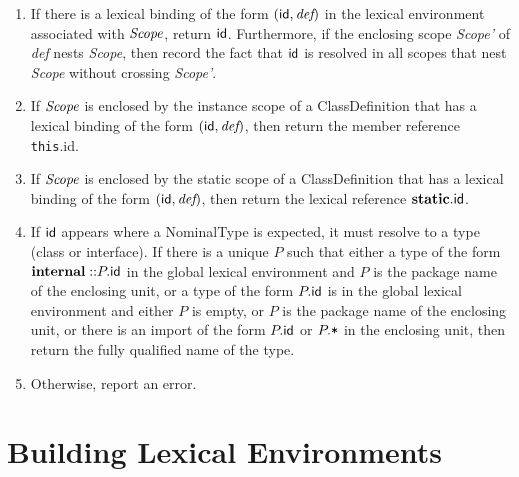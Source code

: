 \makeatletter{}\documentclass[10pt,oneside]{book}
\newcommand{\nonterminal}[1]{{\slantsf #1}}
\theoremstyle{note}
\newcommand{\id}{{\sf id}}
\begin{document}
\begin{enumerate}
\item 
 If there is a lexical binding of the form $(\id, \emph{def})$ in the lexical environment
associated with $\emph{Scope}$, return $\id$. Furthermore, if the
enclosing scope \emph{Scope'} of \emph{def} nests 
\emph{Scope}, then record the
fact that $\id$ is resolved in all scopes that nest \emph{Scope}
without crossing \emph{Scope'}.
\item If $\emph{Scope}$ is enclosed by the instance scope of a
  \nonterminal{ClassDefinition} that has a lexical binding of the form
  $(\id,\emph{def})$, then
return the member reference \verb'this'.\id. 
\item If $\emph{Scope}$ is enclosed by the static scope of a
  \nonterminal{ClassDefinition} that has a lexical binding of the form
  $(\id,\emph{def})$, then return the lexical reference
  ${\bf static}.\id$.  
\item If $\id$ appears where a
  \nonterminal{NominalType} is expected, it must resolve to a type (class or interface).  If there is a unique $P$ such that either a type of the form
${\bf internal::}P.\id$ in the global lexical environment and $P$ is the package name of the
enclosing unit, or a type of the form $P.\id$ is in the global lexical
environment and either $P$ is empty, or $P$ is
the package name of the enclosing unit, or there is an import of the form $P.\id$
  or $P.\verb'*'$ in the enclosing unit, then return the fully
  qualified name of the
  type. 
\item Otherwise, report an error.
\end{enumerate}



\section{Building Lexical Environments}
\end{document}
